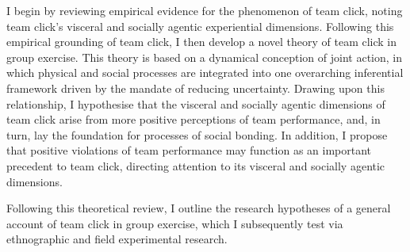 \begin{CJK}{UTF8}{gbsn}
I begin by reviewing empirical evidence for the phenomenon of team click, noting team click's visceral and socially agentic experiential dimensions.  Following this empirical grounding of team click, I then develop a novel theory of team click in group exercise.  This theory is based on a dynamical conception of joint action, in which physical and social processes are integrated into one overarching inferential framework driven by the mandate of reducing uncertainty.
  Drawing upon this relationship, I hypothesise that the visceral and socially agentic dimensions of team click arise from more positive perceptions of team performance, and, in turn, lay the foundation for processes of social bonding. In addition, I propose that positive violations of team performance may function as an important precedent to team click, directing attention to its visceral and socially agentic dimensions.

Following this theoretical review, I outline the research hypotheses of a general account of team click in group exercise, which I subsequently test via ethnographic and field experimental research.







\end{CJK}
